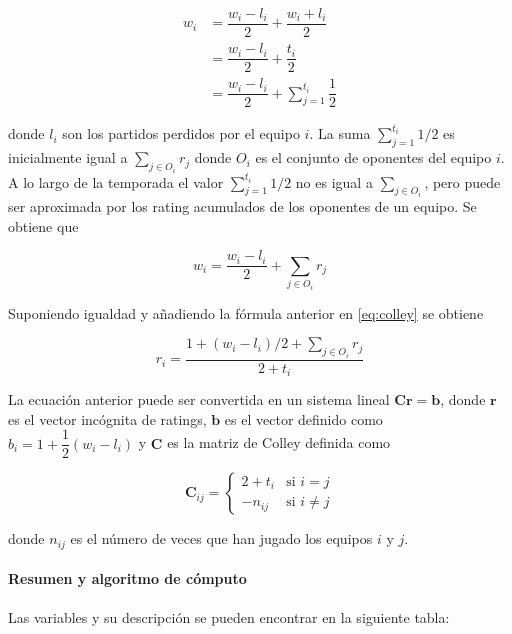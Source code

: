 \begin{align}
w_i & = \dfrac{w_i - l_i}{2} + \dfrac{w_i + l_i}{2} \\
&= \dfrac{w_i - l_i}{2} + \dfrac{t_i}{2} \\
&= \dfrac{w_i - l_i}{2} + \sum_{j=1}^{t_i} \dfrac{1}{2}
\end{align}  

donde $l_i$ son los partidos perdidos por el equipo $i$. La suma $\sum_{j=1}^{t_i} 1/2 $ es inicialmente igual a $\sum_{j \in O_i} r_j$ donde $O_i$ es el conjunto de oponentes del equipo $i$. A lo largo de la temporada el valor $\sum_{j=1}^{t_i} 1/2 $ no es igual a $\sum_{j \in O_i}$, pero puede ser aproximada por los rating acumulados de los oponentes de un equipo. Se obtiene que

\begin{equation}
w_i = \dfrac{w_i - l_i}{2} + \sum_{j \in O_i} r_j
\end{equation}  

Suponiendo igualdad y añadiendo la fórmula anterior en \ref{eq:colley} se obtiene

\begin{equation}
r_i = \dfrac{1+ (w_i - l_i)/2 + \sum_{j \in O_i} r_j }{2 + t_i}
\end{equation}

La ecuación anterior puede ser convertida en un sistema lineal $\mathbf{C r} = \mathbf{b}$, donde $\mathbf{r}$ es el vector incógnita de ratings, $\mathbf{b}$ es el vector definido como $b_i = 1 + \dfrac{1}{2}(w_i - l_i)$ y $\mathbf{C}$ es la matriz de Colley definida como

\begin{equation}
\mathbf{C}_{ij} = \begin{cases}
2 + t_i & \text{si } i = j\\
-n_{ij} & \text{si } i \neq j
\end{cases}
\end{equation}

donde $n_{ij}$ es el número de veces que han jugado los equipos $i$ y $j$.


\paragraph*{Resumen y algoritmo de cómputo}

Las variables y su descripción se pueden encontrar en la siguiente tabla:

